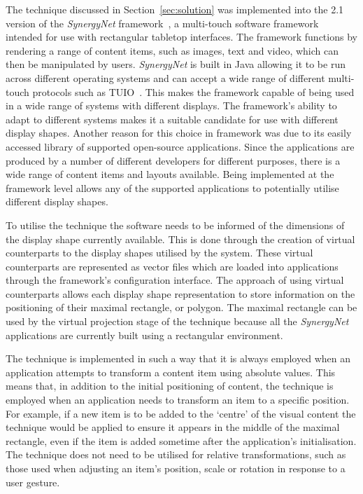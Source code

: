 \documentclass[review,5p,times,twocolumn]{elsarticle}
\begin{document}
The technique discussed in Section~\ref{sec:solution} was implemented into the 2.1 version of the {\emph{SynergyNet}} framework~\cite{McNaughton2017,AlAgha2010}, a multi-touch software framework intended for use with rectangular tabletop interfaces.
The framework functions by rendering a range of content items, such as images, text and video, which can then be manipulated by users.
{\emph{SynergyNet}} is built in Java allowing it to be run across different operating systems and can accept a wide range of different multi-touch protocols such as TUIO~\cite{Kaltenbrunner2007}.
This makes the framework capable of being used in a wide range of systems with different displays.
The framework's ability to adapt to different systems makes it a suitable candidate for use with different display shapes.
Another reason for this choice in framework was due to its easily accessed library of supported open-source applications.
Since the applications are produced by a number of different developers for different purposes, there is a wide range of content items and layouts available.
Being implemented at the framework level allows any of the supported applications to potentially utilise different display shapes.

To utilise the technique the software needs to be informed of the dimensions of the display shape currently available.
This is done through the creation of virtual counterparts to the display shapes utilised by the system.
These virtual counterparts are represented as vector files which are loaded into applications through the framework's configuration interface.
The approach of using virtual counterparts allows each display shape representation to store information on the positioning of their maximal rectangle, or polygon.
The maximal rectangle can be used by the virtual projection stage of the technique because all the {\emph{SynergyNet}} applications are currently built using a rectangular environment.

The technique is implemented in such a way that it is always employed when an application attempts to transform a content item using absolute values.
This means that, in addition to the initial positioning of content, the technique is employed when an application needs to transform an item to a specific position.
For example, if a new item is to be added to the `centre' of the visual content the technique would be applied to ensure it appears in the middle of the maximal rectangle, even if the item is added sometime after the application's initialisation.
The technique does not need to be utilised for relative transformations, such as those used when adjusting an item's position, scale or rotation in response to a user gesture.
\end{document}
